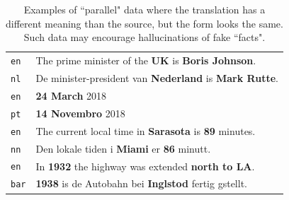 \begin{table}[!ht]
    \small
    \centering
    \begin{tabular}{ll}
        \toprule

        \texttt{en}  & The prime minister of the \textbf{UK} is \textbf{Boris Johnson}.     \\
        \texttt{nl}  & De minister-president van \textbf{Nederland} is \textbf{Mark Rutte}. \\
        \hdashline
        \texttt{en}  & \textbf{24 March} 2018                                               \\
        \texttt{pt}  & \textbf{14 Novembro} 2018                                            \\
        \hdashline
        \texttt{en}  & The current local time in \textbf{Sarasota} is \textbf{89} minutes.  \\
        \texttt{nn}  & Den lokale tiden i \textbf{Miami} er \textbf{86} minutt.             \\
        \hdashline
        \texttt{en}  & In \textbf{1932} the highway was extended \textbf{north to LA}.      \\
        \texttt{bar} & \textbf{1938} is de Autobahn bei \textbf{Inglstod} fertig gstellt.   \\
        \bottomrule
    \end{tabular}
    \caption{Examples of ``parallel" data where the translation has a different meaning than the source, but the form looks the same. Such data may encourage hallucinations of fake ``facts".}
    \label{tab:not_actually_parallel}
\end{table}


